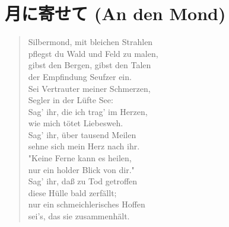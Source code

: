 
\section{月に寄せて (An den Mond)}

\begin{quote}
	Silbermond, mit bleichen Strahlen \\
	pflegst du Wald und Feld zu malen, \\
	gibst den Bergen, gibst den Talen \\
	der Empfindung Seufzer ein. \\

	Sei Vertrauter meiner Schmerzen, \\
	Segler in der L\"ufte See: \\
	Sag' ihr, die ich trag' im Herzen, \\
	wie mich t\"otet Liebesweh. \\

	Sag' ihr, \"uber tausend Meilen \\
	sehne sich mein Herz nach ihr. \\
	"Keine Ferne kann es heilen, \\
	nur ein holder Blick von dir." \\

	Sag' ihr, da{\ss} zu Tod getroffen \\
	diese H\"ulle bald zerf\"allt; \\
	nur ein schmeichlerisches Hoffen \\
	sei's, das sie zusammenh\"alt.
\end{quote}
